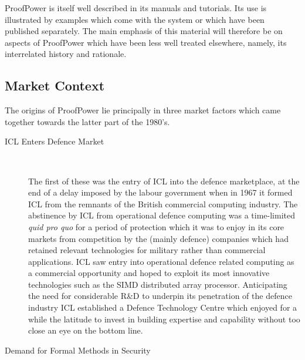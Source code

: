 \documentclass[10pt,titlepage]{book}
\def\Product{ProofPower}
\begin{document}
{\Product} is itself well described in its manuals and tutorials.
Its use is illustrated by examples which come with the system or which have been published separately.
The main emphasis of this material will therefore be on aspects of {\Product} which have been less well treated elsewhere, namely, its interrelated history and rationale.

\subsection{Market Context}

The origins of {\Product} lie principally in three market factors which came together towards the latter part of the 1980's.

\begin{description}

\item [ICL Enters Defence Market]
\ 

The first of these was the entry of ICL into the defence marketplace, at the end of a delay imposed by the labour government when in 1967 it formed ICL from the remnants of the British commercial computing industry.
The abstinence by ICL from operational defence computing was a time-limited {\it quid pro quo} for a period of protection which it was to enjoy in its core markets from competition by the (mainly defence) companies which had retained relevant technologies for military rather than commercial applications.
ICL saw entry into operational defence related computing as a commercial opportunity and hoped to exploit its most innovative technologies such as the SIMD distributed array processor.
Anticipating the need for considerable R\&D to underpin its penetration of the defence industry ICL established a Defence Technology Centre which enjoyed for a while the latitude to invest in building expertise and capability without too close an eye on the bottom line.

\item [Demand for Formal Methods in Security]
\ 
 

\end{description}
\end{document}
